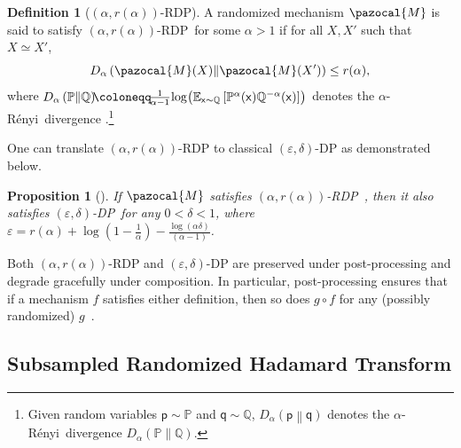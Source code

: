 \documentclass[11pt]{article}
\newtheorem{prop}{Proposition}
\theoremstyle{definition}
\newtheorem{defn}{Definition}
\theoremstyle{plain}
\newcommand{\eps}{{\varepsilon}}
\newcommand{\sx}{{\mathsf{x}}}
\providecommand{\KLDA}[2]{{D_{\alpha} \left( #1 \middle\| #2 \right)}}
\newcommand{\pM}{\pazocal{M}}
\newcommand{\DP}{{\normalfont DP}~}
\newcommand{\RDP}{{\normalfont RDP}~}
\newcommand{\Renyi}{{\normalfont R\'enyi}~}
\renewcommand{\eps}{\varepsilon}
\begin{document}
\begin{defn}[$(\alpha,r(\alpha))$-RDP]
\label{defn:RDP}  
A randomized mechanism $\pM$ is said to satisfy $(\alpha,r(\alpha))$-\RDP for some $\alpha > 1$ if for all $X, X'$ such that \(X \simeq X'\),
\begin{equation}
    \label{eq:RDP}
    \KLDA{\pM(X)}{\pM(X')} \leq r(\alpha),
\end{equation}
where $\KLDA{\mathbb{P}}{\mathbb{Q}} \hspace{-0.2em}\coloneqq\hspace{-0.2em} \frac{1}{\alpha - 1}\hspace{-0.15em}\log\hspace{-0.15em}\big(\mathbb{E}_{\sx \sim \mathbb{Q}}\left[\mathbb{P}^{\alpha}(\sx)\mathbb{Q}^{-\alpha}(\sx)\right]\hspace{-0.15em}\big)$ denotes the $\alpha$-\Renyi divergence \citep{renyi1961measures}.\footnote{Given random variables $\mathsf{p} \sim \mathbb{P}$ and $\mathsf{q} \sim \mathbb{Q}$, $\KLDA{\mathsf{p}}{\mathsf{q}}$ denotes the $\alpha$-\Renyi divergence $\KLDA{\mathbb{P}}{\mathbb{Q}}$. }
\end{defn}

One can translate \((\alpha, r(\alpha))\)-RDP to classical \((\varepsilon, \delta)\)-DP as demonstrated below.

\begin{prop}[{\citet[Proposition 12]{canonne2020discrete}}]
\label{prop:Renyi_classical_translate}
If $\pM$ satisfies $(\alpha, r(\alpha))$-\RDP, then it also satisfies $(\eps, \delta)$-\DP for any $0 < \delta < 1$, where $\eps = r(\alpha) + \log\left(1 - \frac{1}{\alpha}\right) - \frac{\log(\alpha\delta)}{(\alpha - 1)}$.  
\end{prop}

Both $(\alpha,r(\alpha))$-RDP and $(\eps,\delta)$-DP are preserved under post-processing and degrade gracefully under composition. In particular, post-processing ensures that if a mechanism $f$ satisfies either definition, then so does $g\circ f$ for any (possibly randomized) $g$~\citep{Dwork_AlgFoundationd_DP, mironov2017renyi}.
\subsection{Subsampled Randomized Hadamard Transform}
\label{s:SRHT}
\end{document}
